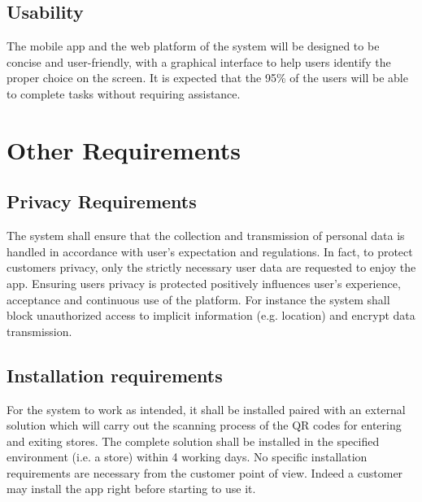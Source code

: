 \subsection{Usability}
The mobile app and the web platform of the system will be designed to be concise and user-friendly, with a graphical interface to help users identify the proper choice on the screen. It is expected that the 95\% of the users will be able to complete tasks without requiring assistance.

\section{Other Requirements}

\subsection{Privacy Requirements}\label{req:privacy}
The system shall ensure that the collection and transmission of personal data is handled in accordance with user’s expectation and regulations.\newline
In fact, to protect customers privacy, only the strictly necessary user data are requested to enjoy the app. Ensuring users privacy is protected positively influences user’s experience, acceptance and continuous use of the platform. For instance the system shall block unauthorized access to implicit information (e.g. location) and encrypt data transmission.

\subsection{Installation requirements}
For the system to work as intended, it shall be installed paired with an external solution which will carry out the scanning process of the QR codes for entering and exiting stores.\newline
The complete solution shall be installed in the specified environment (i.e. a store) within 4 working days.\newline
No specific installation requirements are necessary from the customer point of view. Indeed a customer may install the app right before starting to use it.
